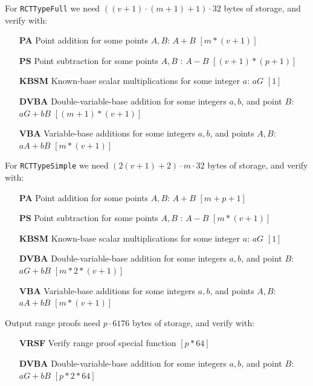 For {\tt RCTTypeFull} we need $((v + 1) \cdot (m + 1) + 1) \cdot 32$ bytes of storage, and verify with:
\begin{itemize}
    \setlength\itemsep{\listspace}
    \item [\textbf{PA}] Point addition for some points $A, B$: $A + B$ \quad \([m*(v+1)]\)%
    \item [\textbf{PS}] Point subtraction for some points $A, B$ : $A - B$ \quad \([(v+1)*(p+1)]\)%
    \item [\textbf{KBSM}] Known-base scalar multiplications for some integer $a$: $a G$ \quad \([1]\)%
    \item [\textbf{DVBA}] Double-variable-base addition for some integers $a, b$, and point $B$: $a G + b B$ \quad \([(m+1)*(v+1)]\)%
    \item [\textbf{VBA}] Variable-base additions for some integers $a, b$, and points $A, B$: $a A + b B$ \quad \([m*(v+1)]\)%
\end{itemize}

For {\tt RCTTypeSimple} we need $(2(v+1)+2) \cdot m \cdot 32$ bytes of storage, and verify with:
\begin{itemize}
    \setlength\itemsep{\listspace}
    \item [\textbf{PA}] Point addition for some points $A, B$: $A + B$ \quad \([m + p + 1]\)%
    \item [\textbf{PS}] Point subtraction for some points $A, B$ : $A - B$ \quad \([m*(v+1)]\)
    \item [\textbf{KBSM}] Known-base scalar multiplications for some integer $a$: $a G$ \quad \([1]\)%
    \item [\textbf{DVBA}] Double-variable-base addition for some integers $a, b$, and point $B$: $a G + b B$ \quad \([m*2*(v+1)]\)
    \item [\textbf{VBA}] Variable-base additions for some integers $a, b$, and points $A, B$: $a A + b B$ \quad \([m*(v+1)]\)
\end{itemize}

Output range proofs need $p \cdot 6176$ bytes of storage, and verify with:
\begin{itemize}
    \setlength\itemsep{\listspace}
    \item [\textbf{VRSF}] Verify range proof special function \quad \([p*64]\)
    \item [\textbf{DVBA}] Double-variable-base addition for some integers $a, b$, and point $B$: $a G + b B$ \quad \([p*2*64]\)
\end{itemize}

